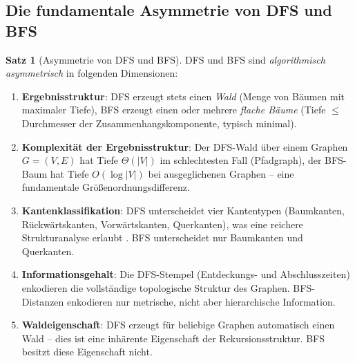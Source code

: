 ﻿\documentclass[a4paper,12pt]{report}
\theoremstyle{definition}
\newtheorem{theorem}{Satz}[chapter]
\theoremstyle{remark}
\begin{document}
\subsection{Die fundamentale Asymmetrie von DFS und BFS}

\begin{theorem}[Asymmetrie von DFS und BFS]
\label{thm:asymmetrie}
DFS und BFS sind \emph{algorithmisch asymmetrisch} in folgenden Dimensionen:
\begin{enumerate}[label=(\roman*)]
  \item \textbf{Ergebnisstruktur}: DFS erzeugt stets einen \emph{Wald}
        (Menge von Bäumen mit maximaler Tiefe), BFS erzeugt einen oder
        mehrere \emph{flache Bäume} (Tiefe $\leq$ Durchmesser der
        Zusammenhangskomponente, typisch minimal).
  \item \textbf{Komplexität der Ergebnisstruktur}: Der DFS-Wald über
        einem Graphen $G = (V, E)$ hat Tiefe $\Theta(|V|)$ im
        schlechtesten Fall (Pfadgraph), der BFS-Baum hat Tiefe
        $O(\log |V|)$ bei ausgeglichenen Graphen -- eine fundamentale
        Größenordnungsdifferenz.
  \item \textbf{Kantenklassifikation}: DFS unterscheidet vier Kantentypen
        (Baumkanten, Rückwärtskanten, Vorwärtskanten, Querkanten), was eine
        reichere Strukturanalyse erlaubt \cite{Cormen2009}. BFS unterscheidet
        nur Baumkanten und Querkanten.
  \item \textbf{Informationsgehalt}: Die DFS-Stempel (Entdeckungs- und
        Abschlusszeiten) enkodieren die vollständige topologische Struktur
        des Graphen. BFS-Distanzen enkodieren nur metrische, nicht aber
        hierarchische Information.
  \item \textbf{Waldeigenschaft}: DFS erzeugt für beliebige Graphen
        automatisch einen Wald -- dies ist eine inhärente Eigenschaft der
        Rekursionsstruktur. BFS besitzt diese Eigenschaft nicht.
\end{enumerate}
\end{theorem}
\end{document}
